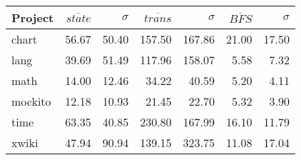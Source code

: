 \begin{tabular}{ l | r r r r r r}
\hline 
\textbf{Project} & \textbf{$\overline{state}$} & \textbf{$\sigma$} & \textbf{$\overline{trans}$} & \textbf{$\sigma$} & \textbf{$\overline{BFS}$} & \textbf{$\sigma$} \\ 
\hline 
chart  &  56.67  &  50.40  &  157.50  &  167.86  &  21.00  &  17.50\\ 
lang  &  39.69  &  51.49  &  117.96  &  158.07  &  5.58  &  7.32\\ 
math  &  14.00  &  12.46  &  34.22  &  40.59  &  5.20  &  4.11\\ 
mockito  &  12.18  &  10.93  &  21.45  &  22.70  &  5.32  &  3.90\\ 
time  &  63.35  &  40.85  &  230.80  &  167.99  &  16.10  &  11.79\\ 
xwiki  &  47.94  &  90.94  &  139.15  &  323.75  &  11.08  &  17.04\\ 
\end{tabular}
